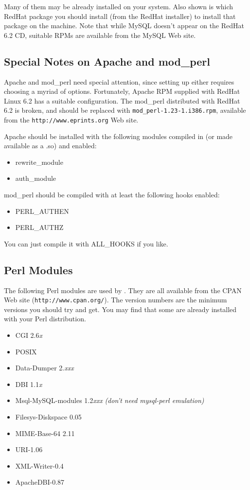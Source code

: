 Many of them may be already installed on your system. Also shown is which RedHat package you should install (from the RedHat installer) to install that package on the machine. Note that while MySQL doesn't appear on the RedHat 6.2 CD, suitable RPMs are available from the MySQL Web site.


\subsection{Special Notes on Apache and mod\_perl}

Apache and mod\_perl need special attention, since setting up either requires choosing a myriad of options. Fortunately, Apache RPM supplied with RedHat Linux 6.2 has a suitable configuration. The mod\_perl distributed with RedHat 6.2 is broken, and should be replaced with {\tt mod\_perl-1.23-1.i386.rpm}, available from the {\tt http://www.eprints.org} Web site.

Apache should be installed with the following modules compiled in (or made available as a .so) and enabled:

\begin{itemize}
\item rewrite\_module
\item auth\_module
\end{itemize}

mod\_perl should be compiled with at least the following hooks enabled:

\begin{itemize}
\item PERL\_AUTHEN
\item PERL\_AUTHZ
\end{itemize}

You can just compile it with ALL\_HOOKS if you like.


\subsection{Perl Modules}

The following Perl modules are used by \eprints. They are all available from the CPAN Web site ({\tt http://www.cpan.org/}). The version numbers are the minimum versions you should try and get. You may find that some are already installed with your Perl distribution.

\begin{itemize}
\item CGI 2.6\emph{x}
\item POSIX
\item Data-Dumper 2.\emph{xxx}
\item DBI 1.1\emph{x}
\item Msql-MySQL-modules 1.2\emph{xxx} \emph{(don't need mysql-perl emulation)}
\item Filesys-Diskspace 0.05
\item MIME-Base-64 2.11
\item URI-1.06
\item XML-Writer-0.4
\item ApacheDBI-0.87
\end{itemize}


